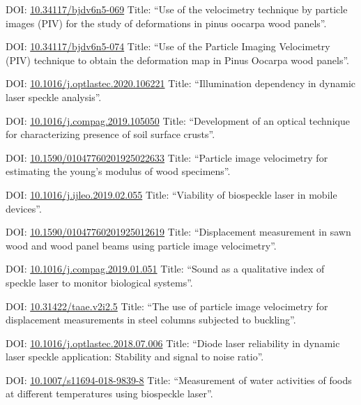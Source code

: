 \documentclass[11pt,a4paper,sans]{moderncv} %
\newcommand{\doiurl}[1]{\href{https://doi.org/#1}{#1}}
\begin{document}
	      {DOI: \doiurl{10.34117/bjdv6n5-069}}{}{}
	      {Title: ``Use of the velocimetry technique by particle images (PIV) for the study of deformations in pinus oocarpa wood panels''.}

	      {DOI: \doiurl{10.34117/bjdv6n5-074}}{}{}
	      {Title: ``Use of the Particle Imaging Velocimetry (PIV) technique to obtain the deformation map in Pinus Oocarpa wood panels''.}

	      {DOI: \doiurl{10.1016/j.optlastec.2020.106221}}{}{}
	      {Title: ``Illumination dependency in dynamic laser speckle analysis''.}

	      {DOI: \doiurl{10.1016/j.compag.2019.105050}}{}{}
	      {Title: ``Development of an optical technique for characterizing presence of soil surface crusts''.}

	      {DOI: \doiurl{10.1590/01047760201925022633}}{}{}
	      {Title: ``Particle image velocimetry for estimating the young’s modulus of wood specimens''.}

	      {DOI: \doiurl{10.1016/j.ijleo.2019.02.055}}{}{}
	      {Title: ``Viability of biospeckle laser in mobile devices''.}

	      {DOI: \doiurl{10.1590/01047760201925012619}}{}{}
	      {Title: ``Displacement measurement in sawn wood and wood panel beams using particle image velocimetry''.}

	      {DOI: \doiurl{10.1016/j.compag.2019.01.051}}{}{}
	      {Title: ``Sound as a qualitative index of speckle laser to monitor biological systems''.}

	      {DOI: \doiurl{10.31422/taae.v2i2.5}}{}{}
	      {Title: ``The use of particle image velocimetry for displacement measurements in steel columns subjected to buckling''.}
	      
	      {DOI: \doiurl{10.1016/j.optlastec.2018.07.006}}{}{}
	      {Title: ``Diode laser reliability in dynamic laser speckle application: Stability and signal to noise ratio''.}
	      
	      {DOI: \doiurl{10.1007/s11694-018-9839-8}}{}{}
	      {Title: ``Measurement of water activities of foods at different temperatures using biospeckle laser''.}
\end{document}
